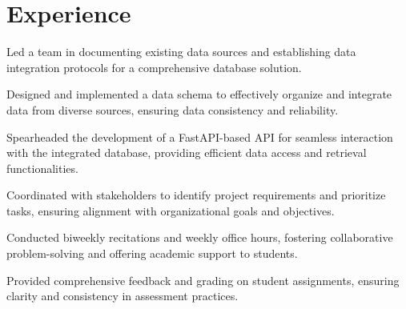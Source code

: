 \documentclass[letterpaper]{AMcEnaneyResume} %
\begin{document}
\begin{minipage}[t]{0.66\textwidth} %


\section{Experience}


        \vspace{\topsep} %
        \begin{tightitemize}
            \item Led a team in documenting existing data sources and establishing data integration protocols for a comprehensive database solution.
            \item Designed and implemented a data schema to effectively organize and integrate data from diverse sources, ensuring data consistency and reliability.
            \item Spearheaded the development of a FastAPI-based API for seamless interaction with the integrated database, providing efficient data access and retrieval functionalities.
            \item Coordinated with stakeholders to identify project requirements and prioritize tasks, ensuring alignment with organizational goals and objectives.
        \end{tightitemize}

        \sectionspace %



        \begin{tightitemize}
            \item Conducted biweekly recitations and weekly office hours, fostering collaborative problem-solving and offering academic support to students.
            \item Provided comprehensive feedback and grading on student assignments, ensuring clarity and consistency in assessment practices.
        \end{tightitemize}


\end{minipage}
\end{document}
